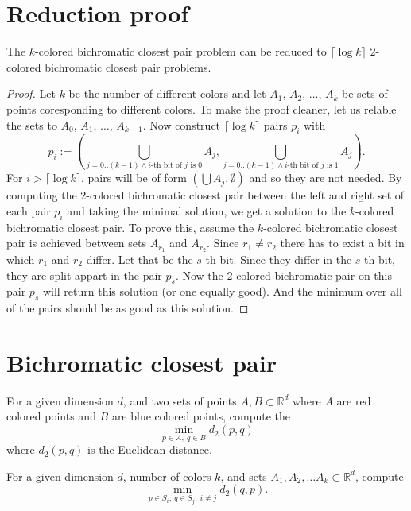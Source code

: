 \documentclass[a4paper,UKenglish,cleveref, autoref, thm-restate]{lipics-v2021}
\begin{document}
\section{Reduction proof}
\begin{theorem}
The $k$-colored bichromatic closest pair problem can be reduced to $\lceil \log k \rceil$ $2$-colored bichromatic closest pair problems.
\end{theorem}
\begin{proof}
  Let $k$ be the number of different colors and let $A_1$, $A_2$, $\dots$, $A_k$ be sets of points coresponding to different colors.
  To make the proof cleaner, let us relable the sets to $A_0$, $A_1$, $\dots$, $A_{k-1}$.
  Now construct $\lceil \log k \rceil$ pairs $p_i$ with
  \[ p_i := \left(\bigcup \limits_{j = 0..(k-1) \wedge i\text{-th bit of }j \text{ is }0} A_j, \bigcup \limits_{j = 0..(k-1) \wedge i\text{-th bit of } j \text{ is }1} A_j\right). \]
  For $i > \lceil \log k \rceil$, pairs will be of form $( \bigcup A_j, \emptyset)$ and so they are not needed.
  By computing the $2$-colored bichromatic closest pair between the left and right set of each pair $p_i$ and taking the minimal solution, we get a solution to the $k$-colored bichromatic closest pair.
  To prove this, assume the $k$-colored bichromatic closest pair is achieved between sets $A_{r_1}$ and $A_{r_2}$.
  Since $r_1 \neq r_2$ there has to exist a bit in which $r_1$ and $r_2$ differ.
  Let that be the $s$-th bit.
  Since they differ in the $s$-th bit, they are split appart in the pair $p_s$.
  Now the $2$-colored bichromatic pair on this pair $p_s$ will return this solution (or one equally good).
  And the minimum over all of the pairs should be as good as this solution.
  
\end{proof}

\section{Bichromatic closest pair}

\begin{definition}
For a given dimension $d$, and two sets of points $A, B \subset \mathbb{R}^d$ where $A$ are red colored points and $B$ are blue colored points, compute the
$$ \min \limits_{p \in A,\ q\in B} d_2(p, q) $$
where $d_2(p, q)$ is the Euclidean distance.
\end{definition}

\begin{definition}
For a given dimension $d$, number of colors $k$, and sets $A_1, A_2, \dots A_k \subset \mathbb{R}^d$,
compute
$$ \min \limits_{p \in S_i,\ q \in S_j,\ i \neq j} d_2(q, p). $$

\end{definition}
\end{document}
